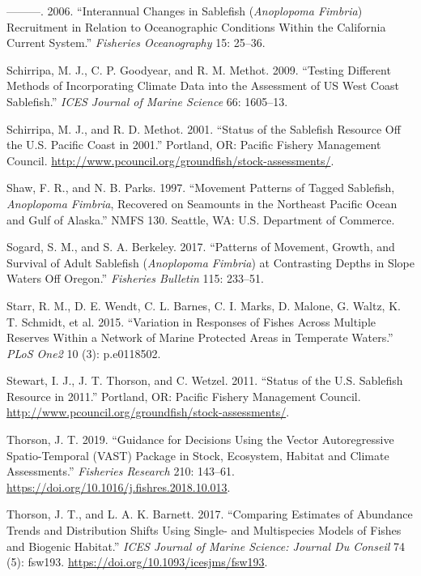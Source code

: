 \documentclass[11pt,
  english,
  a4paper,
]{article}
\begin{document}
\begin{cslreferences}
\leavevmode\hypertarget{ref-schirripa2006}{}%
---------. 2006. ``Interannual Changes in Sablefish (\emph{Anoplopoma Fimbria}) Recruitment in Relation to Oceanographic Conditions Within the California Current System.'' \emph{Fisheries Oceanography} 15: 25--36.

\leavevmode\hypertarget{ref-schirripa2009icesjms}{}%
Schirripa, M. J., C. P. Goodyear, and R. M. Methot. 2009. ``Testing Different Methods of Incorporating Climate Data into the Assessment of US West Coast Sablefish.'' \emph{ICES Journal of Marine Science} 66: 1605--13.

\leavevmode\hypertarget{ref-schirripa2001sablefish}{}%
Schirripa, M. J., and R. D. Methot. 2001. ``Status of the Sablefish Resource Off the U.S. Pacific Coast in 2001.'' Portland, OR: Pacific Fishery Management Council. \url{http://www.pcouncil.org/groundfish/stock-assessments/}.

\leavevmode\hypertarget{ref-shaw1997}{}%
Shaw, F. R., and N. B. Parks. 1997. ``Movement Patterns of Tagged Sablefish, \emph{Anoplopoma Fimbria}, Recovered on Seamounts in the Northeast Pacific Ocean and Gulf of Alaska.'' NMFS 130. Seattle, WA: U.S. Department of Commerce.

\leavevmode\hypertarget{ref-sogard2017}{}%
Sogard, S. M., and S. A. Berkeley. 2017. ``Patterns of Movement, Growth, and Survival of Adult Sablefish (\emph{Anoplopoma Fimbria}) at Contrasting Depths in Slope Waters Off Oregon.'' \emph{Fisheries Bulletin} 115: 233--51.

\leavevmode\hypertarget{ref-Starr2015}{}%
Starr, R. M., D. E. Wendt, C. L. Barnes, C. I. Marks, D. Malone, G. Waltz, K. T. Schmidt, et al. 2015. ``Variation in Responses of Fishes Across Multiple Reserves Within a Network of Marine Protected Areas in Temperate Waters.'' \emph{PLoS One2} 10 (3): p.e0118502.

\leavevmode\hypertarget{ref-stewart2011sablefish}{}%
Stewart, I. J., J. T. Thorson, and C. Wetzel. 2011. ``Status of the U.S. Sablefish Resource in 2011.'' Portland, OR: Pacific Fishery Management Council. \url{http://www.pcouncil.org/groundfish/stock-assessments/}.

\leavevmode\hypertarget{ref-thorson_guidance_2019}{}%
Thorson, J. T. 2019. ``Guidance for Decisions Using the Vector Autoregressive Spatio-Temporal (VAST) Package in Stock, Ecosystem, Habitat and Climate Assessments.'' \emph{Fisheries Research} 210: 143--61. \url{https://doi.org/10.1016/j.fishres.2018.10.013}.

\leavevmode\hypertarget{ref-thorson_comparing_2017}{}%
Thorson, J. T., and L. A. K. Barnett. 2017. ``Comparing Estimates of Abundance Trends and Distribution Shifts Using Single- and Multispecies Models of Fishes and Biogenic Habitat.'' \emph{ICES Journal of Marine Science: Journal Du Conseil} 74 (5): fsw193. \url{https://doi.org/10.1093/icesjms/fsw193}.


\end{cslreferences}
\end{document}
